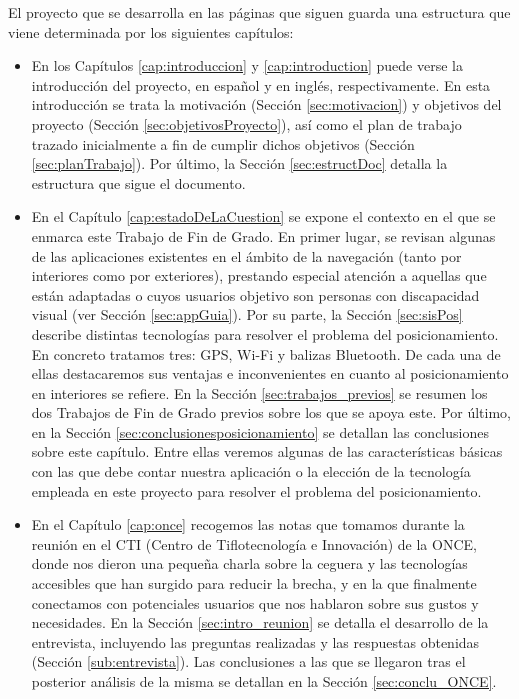 El proyecto que se desarrolla en las páginas que siguen guarda una estructura que viene determinada por los siguientes capítulos:

\begin{itemize}
	
	\item En los Capítulos \ref{cap:introduccion} y \ref{cap:introduction} puede verse la introducción del proyecto, en español y en inglés, respectivamente. En esta introducción se trata la motivación (Sección \ref{sec:motivacion}) y objetivos del proyecto (Sección \ref{sec:objetivosProyecto}), así como el plan de trabajo trazado inicialmente a fin de cumplir dichos objetivos (Sección \ref{sec:planTrabajo}). Por último, la Sección \ref{sec:estructDoc} detalla la estructura que sigue el documento.
	
	\item En el Capítulo \ref{cap:estadoDeLaCuestion} se expone el contexto en el que se enmarca este Trabajo de Fin de Grado. En primer lugar, se revisan algunas de las aplicaciones existentes en el ámbito de la navegación (tanto por interiores como por exteriores), prestando especial atención a aquellas que están adaptadas o cuyos usuarios objetivo son personas con discapacidad visual (ver Sección \ref{sec:appGuia}). Por su parte, la Sección \ref{sec:sisPos} describe distintas tecnologías para resolver el problema del posicionamiento. En concreto tratamos tres: GPS, Wi-Fi y balizas Bluetooth. De cada una de ellas destacaremos sus ventajas e inconvenientes en cuanto al posicionamiento en interiores se refiere. En la Sección \ref{sec:trabajos_previos} se resumen los dos Trabajos de Fin de Grado previos sobre los que se apoya este. Por último, en la Sección \ref{sec:conclusionesposicionamiento} se detallan las conclusiones sobre este capítulo. Entre ellas veremos algunas de las características básicas con las que debe contar nuestra aplicación o la elección de la tecnología empleada en este proyecto para resolver el problema del posicionamiento. 
	
	\item En el Capítulo \ref{cap:once} recogemos las notas que tomamos durante la reunión en el CTI (Centro de Tiflotecnología e Innovación) de la ONCE, donde nos dieron una pequeña charla sobre la ceguera y las tecnologías accesibles que han surgido para reducir la brecha, y en la que finalmente conectamos con potenciales usuarios que nos hablaron sobre sus gustos y necesidades. En la Sección \ref{sec:intro_reunion} se detalla el desarrollo de la entrevista, incluyendo las preguntas realizadas y las respuestas obtenidas (Sección \ref{sub:entrevista}). Las conclusiones a las que se llegaron tras el posterior análisis de la misma se detallan en la Sección \ref{sec:conclu_ONCE}. 
	

\end{itemize}
